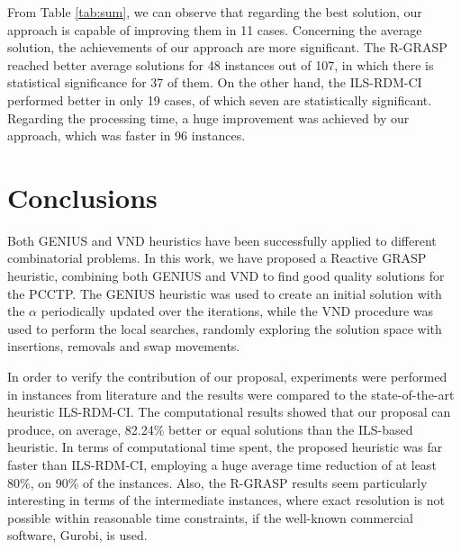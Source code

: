 \documentclass{ro}
\begin{document}
From Table \ref{tab:sum}, we can observe that regarding the best solution, our approach is capable of improving them in 11 cases. Concerning the average solution, the achievements of our approach are more significant. The R-GRASP reached
better average solutions for 48 instances out of 107, in which there is statistical significance for 37 of them. On the other hand, the ILS-RDM-CI
performed better in only 19 cases, of which seven are statistically significant. Regarding the processing time, a huge improvement was achieved by our approach, which was faster in 96 instances. 


\section{Conclusions}
\label{sec:conclusions}



Both GENIUS and VND heuristics have been successfully applied to different combinatorial problems. In this work, we have proposed a Reactive GRASP  heuristic, combining both GENIUS and VND  to find good quality solutions for the PCCTP. The GENIUS heuristic was used to create an initial solution with the $\alpha$ periodically updated over the iterations, while the VND procedure
was used to perform the local searches, randomly exploring the solution space with insertions, removals and
swap movements.


In order to verify the contribution of our proposal, experiments were performed in instances from literature and the results were compared to the state-of-the-art heuristic ILS-RDM-CI. The computational results showed that our proposal can produce, on average, 82.24\% better or equal solutions than the ILS-based heuristic. In terms of computational time spent, the proposed heuristic was far faster than ILS-RDM-CI, employing a huge average time reduction of at least 80\%, on 90\% of the instances. Also, the R-GRASP results seem particularly interesting in terms of the intermediate instances, where exact resolution is not possible within reasonable time constraints, if the well-known commercial software, Gurobi, is used.
\end{document}
